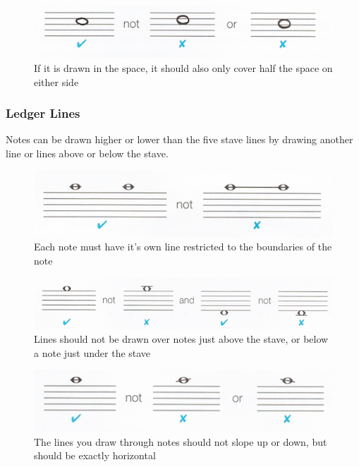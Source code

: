 \begin{figure}[h!]
  \includegraphics[width=\linewidth]{gfx/basic/semibreve-on-space.png}
  \centering
  \caption{If it is drawn in the space, it should also only cover half the space on either side}
  \label{fig:SemibreveOnSpace}
\end{figure}

\subsubsection{Ledger Lines}

Notes can be drawn higher or lower than the five stave lines by drawing another line or lines above or below the stave.

\begin{figure}[h!]
  \includegraphics[width=\linewidth]{gfx/basic/ledger-boundaries.png}
  \centering
  \caption{Each note must have it's own line restricted to the boundaries of the note}
  \label{fig:LedgerBoundaries}
\end{figure}


\begin{figure}[h!]
  \includegraphics[width=\linewidth]{gfx/basic/ledger-above.png}
  \centering
  \caption{Lines should not be drawn over notes just above the stave, or below a note just under the stave}
  \label{fig:LedgerAbove}
\end{figure}


\begin{figure}[h!]
  \includegraphics[width=\linewidth]{gfx/basic/ledger-slope.png}
  \centering
  \caption{The lines you draw through notes should not slope up or down, but should be exactly horizontal}
  \label{fig:LedgerSlope}
\end{figure}

